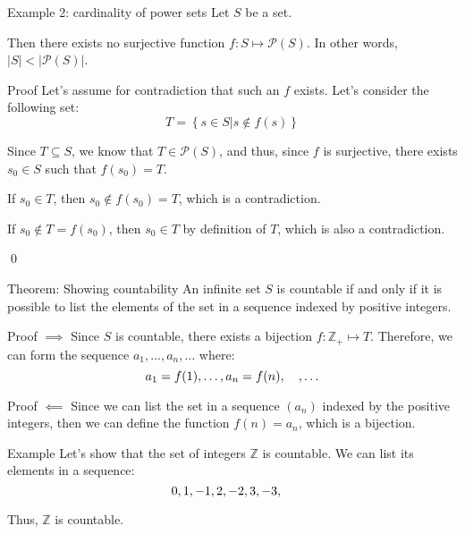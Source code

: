 \documentclass[a4paper]{article}
\begin{document}
\begin{parag}{Example 2: cardinality of power sets}
    Let $S$ be a set.

    Then there exists no surjective function $f : S \mapsto \mathcal{P}\left(S\right)$. In other words, $\left|S\right| < \left|\mathcal{P}\left(S\right)\right|$.

    \begin{subparag}{Proof}
        Let's assume for contradiction that such an $f$ exists. Let's consider the following set:
        \[T = \left\{s \in S | s \not\in f\left(s\right)\right\}\]

        Since $T \subseteq S$, we know that $T \in \mathcal{P}\left(S\right)$, and thus, since $f$ is surjective, there exists $s_0 \in S$ such that $f\left(s_0\right) = T$.

        If $s_0 \in T$, then $s_0 \not\in f\left(s_0\right) = T$, which is a contradiction.

        If $s_0 \not\in T = f\left(s_0\right)$, then $s_0 \in T$ by definition of $T$, which is also a contradiction.

        \qed
    \end{subparag}
\end{parag}

\begin{parag}{Theorem: Showing countability}
    An infinite set $S$ is countable if and only if it is possible to list the elements of the set in a sequence indexed by positive integers.

    \begin{subparag}{Proof $\implies$}
        Since $S$ is countable, there exists a bijection $f : \mathbb{Z}_+ \mapsto T$. Therefore, we can form the sequence $a_1, \ldots, a_n, \ldots$ where:
        \[a_1 = f\left(1\right), \ldots, a_n = f\left(n\right), \mathspace, \ldots\]
    \end{subparag}

    \begin{subparag}{Proof $\impliedby$}
        Since we can list the set in a sequence $\left(a_n\right)$ indexed by the positive integers, then we can define the function $f\left(n\right) = a_n$, which is a bijection.
    \end{subparag}
\end{parag}

\begin{parag}{Example}
    Let's show that the set of integers $\mathbb{Z}$ is countable. We can list its elements in a sequence:
    \[0, 1, -1, 2, -2, 3, -3, \quad\]

    Thus, $\mathbb{Z}$ is countable.
\end{parag}
\end{document}
